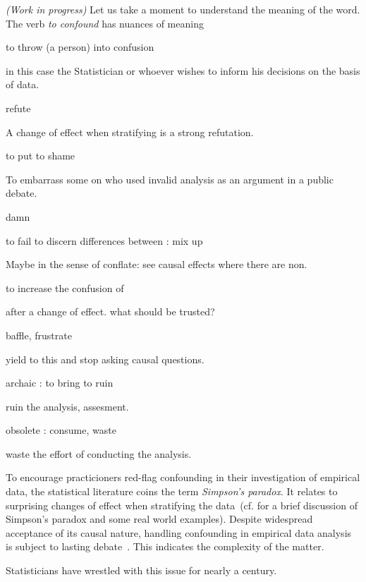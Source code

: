 \begin{ftheorem}
  \emph{(Work in progress)}
Let us take a moment to understand the meaning of the word.
The verb \textit{to confound} has nuances of meaning\cite{zotero-327}

to throw (a person) into confusion

in this case the Statistician or whoever wishes to inform his decisions on the basis of data.

refute

A change of effect when stratifying is a strong refutation.

to put to shame

To embarrass some on who used invalid analysis as an argument in a  public debate. 

damn



to fail to discern differences between : mix up

Maybe in the sense of conflate: see causal effects where there are non.

to increase the confusion of

after a change of effect. what should be trusted?

baffle, frustrate

yield to this and stop asking causal questions.



archaic : to bring to ruin

ruin the analysis, assesment.

 obsolete : consume, waste 

 waste the effort of conducting the analysis.



\end{ftheorem}
To encourage practicioners
red-flag confounding in their investigation of empirical data, the statistical literature coins the term 
\textit{Simpson's paradox}. It relates to surprising changes of effect when stratifying the data~(cf.\cite{Wagner1982} for a brief discussion of Simpson's paradox and some real world examples).
Despite widespread acceptance of its causal nature,
handling confounding in empirical data analysis is subject to lasting debate~\cite[§6]{pearl2009causality}.
This indicates the complexity of the matter.

Statisticians have wrestled with this issue for nearly a century.

